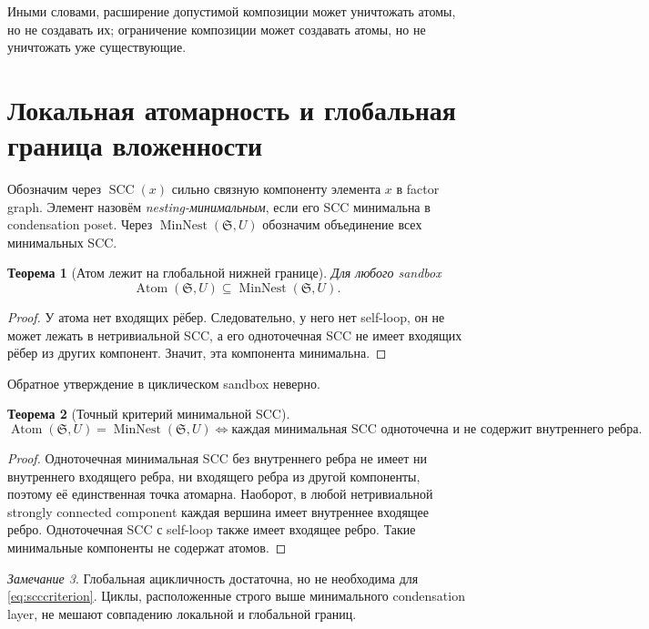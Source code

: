 \documentclass[11pt]{article}
\newtheorem{theorem}{Теорема}[section]
\theoremstyle{definition}
\theoremstyle{remark}
\newtheorem{remark}[theorem]{Замечание}
\newcommand{\Sbx}{\mathfrak S}
\newcommand{\Atom}{\operatorname{Atom}}
\newcommand{\MinNest}{\operatorname{MinNest}}
\newcommand{\SCC}{\operatorname{SCC}}
\begin{document}
Иными словами, расширение допустимой композиции может уничтожать атомы, но не создавать их; ограничение композиции может создавать атомы, но не уничтожать уже существующие.

\section{Локальная атомарность и глобальная граница вложенности}

Обозначим через \(\SCC(x)\) сильно связную компоненту элемента \(x\) в factor graph. Элемент назовём \emph{nesting-минимальным}, если его SCC минимальна в condensation poset. Через \(\MinNest(\Sbx,U)\) обозначим объединение всех минимальных SCC.

\begin{theorem}[Атом лежит на глобальной нижней границе]
Для любого sandbox
\begin{equation}
\boxed{\Atom(\Sbx,U)\subseteq\MinNest(\Sbx,U).}
\label{eq:atommin}
\end{equation}
\end{theorem}

\begin{proof}
У атома нет входящих рёбер. Следовательно, у него нет self-loop, он не может лежать в нетривиальной SCC, а его одноточечная SCC не имеет входящих рёбер из других компонент. Значит, эта компонента минимальна.
\end{proof}

Обратное утверждение в циклическом sandbox неверно.

\begin{theorem}[Точный критерий минимальной SCC]
\begin{equation}
\boxed{
\Atom(\Sbx,U)=\MinNest(\Sbx,U)
\iff
\text{каждая минимальная SCC одноточечна и не содержит внутреннего ребра}.}
\label{eq:scccriterion}
\end{equation}
\end{theorem}

\begin{proof}
Одноточечная минимальная SCC без внутреннего ребра не имеет ни внутреннего входящего ребра, ни входящего ребра из другой компоненты, поэтому её единственная точка атомарна. Наоборот, в любой нетривиальной strongly connected component каждая вершина имеет внутреннее входящее ребро. Одноточечная SCC с self-loop также имеет входящее ребро. Такие минимальные компоненты не содержат атомов.
\end{proof}

\begin{remark}
Глобальная ацикличность достаточна, но не необходима для \eqref{eq:scccriterion}. Циклы, расположенные строго выше минимального condensation layer, не мешают совпадению локальной и глобальной границ.
\end{remark}
\end{document}
